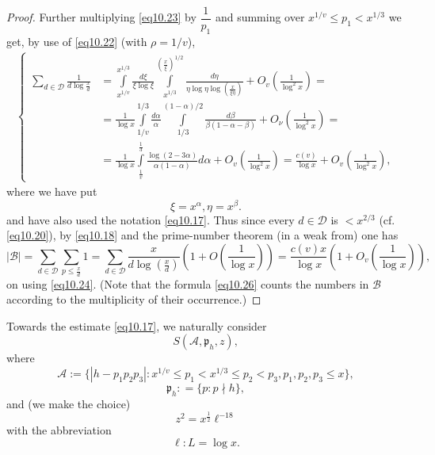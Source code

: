 \begin{proof}
Further multiplying \eqref{eq10.23} by $\dfrac{1}{p_1}$ and summing over
$x^{1/v} \leq p_1 < x^{1/3}$ we get, by use of \eqref{eq10.22} (with $\rho
= 1/v$), 
\begin{align*}
\begin{cases}
\sum\limits_{d \in \mathscr{D}} \frac{1}{d \log \frac{x}{d}}  & =
\int\limits_{x^{1/v}}^{x^{1/3}} \frac{d \xi}{\xi \log \xi}
\int\limits_{x^{1/3}}^{(\frac{x}{\xi})^{1/2}} \frac{d
  \eta}{\eta \log \eta \log (\frac{x}{\xi\eta})} + O_v
(\frac{1}{\log^2 x})= \\ 
& = \frac{1}{\log x} \int\limits_{1/v}^{1/3} \frac{d \alpha}{\alpha}
\int\limits^{(1 - \alpha)/2}_{1/3} \frac{d
  \beta}{\beta(1-\alpha-\beta)}+ O_\nu (\frac{1}{\log^2 x})=\\ 
& = \frac{1}{\log x} \int\limits_{\frac{1}{v}}^{\frac{1}{3}}
\frac{\log(2-3\alpha)}{\alpha (1-\alpha)} d\alpha + O_v
(\frac{1}{\log^2 x})= \frac{c(v)}{\log x}+ O_v (\frac{1}{\log^2 x}),
\end{cases} \tag{10.24} \label{eq10.24}
\end{align*}
where we have put
\begin{equation*}
\xi = x^{\alpha}, \eta = x^{\beta}. \tag{10.25}\label{eq10.25}
\end{equation*}
and have also used the notation \eqref{eq10.17}. Thus since every $d
\in \mathscr{D}$ is $< x^{2/3}$ (cf. \eqref{eq10.20}),\pageoriginale
by \eqref{eq10.18} and the prime-number theorem (in a weak from) one has 
\begin{equation*}
|\mathscr{B}|= \sum_{d \in \mathscr{D}} \sum_{p \leq \frac{x}{d}}1 =
\sum_{d \in \mathscr{D}} \frac{x}{d \log (\frac{x}{d})}
(1+O(\frac{1}{\log x}))= \frac{c(v)x}{\log x}(1+O_v(\frac{1}{\log
  x})), \tag{10.26}\label{eq10.26} 
\end{equation*}
on using \eqref{eq10.24}. (Note that the formula \eqref{eq10.26} counts the
numbers in $\mathscr{B}$ according to the multiplicity of their
occurrence.) 
\end{proof}

Towards the estimate \eqref{eq10.17}, we naturally consider
\begin{equation*}
S(\mathscr{A}, \mathfrak{p}_h, z), \tag{10.27}\label{eq10.27}
 \end{equation*} 
 where
\begin{equation*}
\mathscr{A}:= \bigg\{ |h-p_1 p_2 p_3|: x^{1/v}\leq p_1 < x^{1/3} \leq
p_2< p_3, p_1, p_2,p_3 \leq x\bigg\}, \tag{10.28}\label{eq10.28} 
 \end{equation*} 
 \begin{equation*}
\mathfrak{p}_h : = \{ p:p \nmid h \}, \tag{10.29}\label{eq10.29}
 \end{equation*} 
 and (we make the choice)
 \begin{equation*}
z^2 = x^{\frac{1}{2}} \ell^{-18} \tag{10.30}\label{eq10.30}
  \end{equation*}  
with the abbreviation
 \begin{equation*}
\ell:L = \log x. \tag{10.31}\label{eq10.31}
 \end{equation*} 
 
